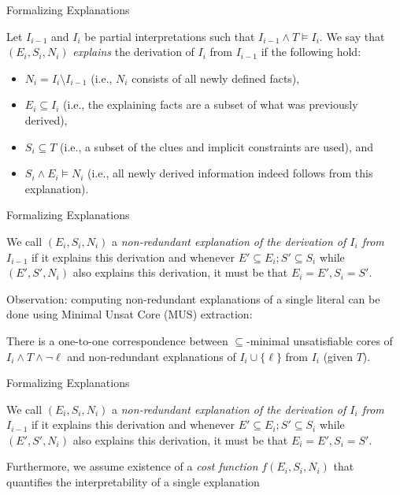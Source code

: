 \documentclass[12pt,aspectratio=169]{beamer}
\begin{document}
 
 
\begin{frame}{Formalizing Explanations}
 \begin{definition}
 Let $I_{i-1}$ and $I_i$ be partial interpretations such that $I_{i-1}\wedge T \models I_i$.
 We say that $(E_i,S_i,N_i)$ \emph{explains} the derivation of $I_{i}$ from $I_{i-1}$ if the following hold:
\begin{itemize}
    \item $N_i= I_i \setminus I_{i-1}$ (i.e., $N_i$ consists of all newly defined facts), 
	\item $E_i\subseteq I_i$ (i.e., the explaining facts are a subset of what was previously derived),
	\item $S_i \subseteq T$ (i.e., a subset of the clues and implicit constraints are used), and 
	\item $S_i \land E_i \models N_i$ (i.e., all newly derived information indeed follows from this explanation).
\end{itemize}
\end{definition}
\end{frame}

\begin{frame}{Formalizing Explanations}
 \begin{definition}
 We call $(E_i,S_i,N_i)$ a \emph{non-redundant explanation of  the derivation of $I_i$ from $I_{i-1}$} if it explains this derivation and whenever $E'\subseteq E_i; S'\subseteq S_i$ while $(E',S',N_i)$ also explains this derivation, it must be that $E_i=E', S_i=S'$. 
\end{definition}
\pause
Observation: computing non-redundant explanations of a single literal can be done using Minimal Unsat Core (MUS) extraction:
\begin{theorem}
  There is a one-to-one correspondence between $\subseteq$-minimal unsatisfiable cores of $I_i\land T\land \lnot \ell$ and non-redundant explanations of $I_i\cup\{\ell\}$ from $I_i$ (given $T$).
\end{theorem}

\end{frame}






\begin{frame}{Formalizing Explanations}
 \begin{definition}
 We call $(E_i,S_i,N_i)$ a \emph{non-redundant explanation of  the derivation of $I_i$ from $I_{i-1}$} if it explains this derivation and whenever $E'\subseteq E_i; S'\subseteq S_i$ while $(E',S',N_i)$ also explains this derivation, it must be that $E_i=E', S_i=S'$. 
\end{definition}
Furthermore, we assume existence of a \emph{cost function} $f(E_i,S_i,N_i)$ that quantifies the interpretability of a single explanation
\end{frame}
\end{document}
